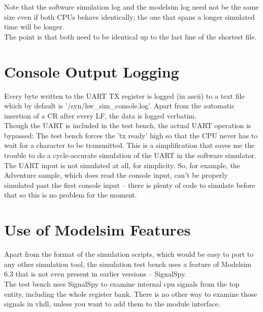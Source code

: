     Note that the software simulation log and the modelsim log need not be the
    same size even if both CPUs behave identically; the one that spans a longer 
    simulated time will be longer.\\
    The point is that both need to be identical up to the last line of the
    shortest file.\\
    
\section{Console Output Logging}
\label{uart_logging}

    Every byte written to the UART TX register is logged (in ascii) to a text
    file which by default is '/syn/hw\_sim\_console.log'. Apart from the
    automatic insertion of a CR after every LF, the data is logged verbatim.\\
    
    Though the UART is included in the test bench, the actual UART operation is 
    bypassed: The test bench forces the 'tx ready' high so that the CPU never has
    to wait for a character to be transmitted. This is a simplification that 
    saves me the trouble to do a cycle-accurate simulation of the UART in the 
    software simulator.\\
    
    The UART input is not simulated at all, for simplicity. So, for example, the
    Adventure sample, which does read the console input, can't be properly 
    simulated past the first console input -- there is plenty of code to 
    simulate before that so this is no problem for the moment.\\


\section{Use of Modelsim Features}
\label{modelsim_dependencies}

    Apart from the format of the simulation scripts, which would be easy to port
    to any other simulation tool, the simulation test bench uses a feature of
    Modelsim 6.3 that is not even present in earlier versions -- SignalSpy.\\

    The test bench uses SignalSpy to examine internal cpu signals from the top
    entity, including the whole register bank. There is no other way to examine
    those signals in vhdl, unless you want to add them to the module interface.\\

